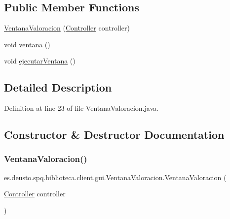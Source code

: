\subsection*{Public Member Functions}
\begin{DoxyCompactItemize}
\item 
\mbox{\hyperlink{classes_1_1deusto_1_1spq_1_1biblioteca_1_1client_1_1gui_1_1_ventana_valoracion_a00caacf21e8061e9838ab07c295edc07}{Ventana\+Valoracion}} (\mbox{\hyperlink{classes_1_1deusto_1_1spq_1_1biblioteca_1_1controller_1_1_controller}{Controller}} controller)
\item 
void \mbox{\hyperlink{classes_1_1deusto_1_1spq_1_1biblioteca_1_1client_1_1gui_1_1_ventana_valoracion_ae8f27fb158d5eb96f275b805f40446e1}{ventana}} ()
\item 
void \mbox{\hyperlink{classes_1_1deusto_1_1spq_1_1biblioteca_1_1client_1_1gui_1_1_ventana_valoracion_a845618b09860a4932b3a818db7e5ddb4}{ejecutar\+Ventana}} ()
\end{DoxyCompactItemize}


\subsection{Detailed Description}


Definition at line 23 of file Ventana\+Valoracion.\+java.



\subsection{Constructor \& Destructor Documentation}
\mbox{\label{classes_1_1deusto_1_1spq_1_1biblioteca_1_1client_1_1gui_1_1_ventana_valoracion_a00caacf21e8061e9838ab07c295edc07}} 
\subsubsection{\texorpdfstring{Ventana\+Valoracion()}{VentanaValoracion()}}
{\footnotesize\ttfamily es.\+deusto.\+spq.\+biblioteca.\+client.\+gui.\+Ventana\+Valoracion.\+Ventana\+Valoracion (\begin{DoxyParamCaption}\item[{\mbox{\hyperlink{classes_1_1deusto_1_1spq_1_1biblioteca_1_1controller_1_1_controller}{Controller}}}]{controller }\end{DoxyParamCaption})}

